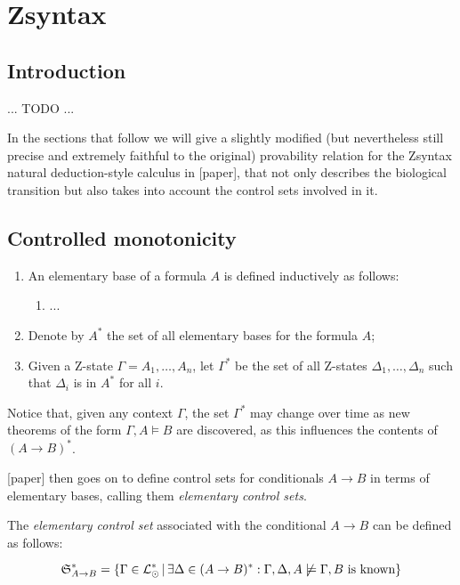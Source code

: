 \section{Zsyntax}

\subsection{Introduction}

... TODO ...

In the sections that follow we will give a slightly modified (but nevertheless
still precise and extremely faithful to the original) provability relation for
the Zsyntax natural deduction-style calculus in [paper], that not only describes
the biological transition but also takes into account the control sets involved
in it.

\subsection{Controlled monotonicity}

\begin{definition}
  \begin{enumerate}
  \item An elementary base of a formula $A$ is defined inductively as follows:

    \begin{enumerate}
    \item ...
    \end{enumerate}

  \item Denote by $A^*$ the set of all elementary bases for the formula $A$;
  \item Given a Z-state $\Gamma = A_1, \dots, A_n$, let $\Gamma^*$ be the set of
    all Z-states $\Delta_1, \dots, \Delta_n$ such that $\Delta_i$ is in $A^*$
    for all $i$.
  \end{enumerate}
\end{definition}

Notice that, given any context $\Gamma$, the set $\Gamma^*$ may change over time
as new theorems of the form $\Gamma, A \models B$ are discovered, as this
influences the contents of $(A \rightarrow B)^*$.

[paper] then goes on to define control sets for conditionals $A \rightarrow B$
in terms of elementary bases, calling them \emph{elementary control sets}.

\begin{definition}
  The \emph{elementary control set} associated with the conditional
  $A \rightarrow B$ can be defined as follows:

  \[
    \mathfrak{S}_{A \rightarrow B}^* = \{
    \Gamma \in \mathcal{L}_{\odot}^* \, | \, \exists \Delta \in (A \rightarrow
    B)^*
    : \Gamma, \Delta, A \not \models \Gamma, B \text{ is known}
    \}
  \]
\end{definition}

